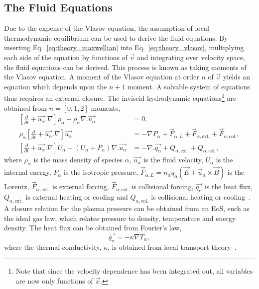 \subsection{The Fluid Equations}%
\label{sec:theory_fluid}

Due to the expense of the Vlasov equation, the assumption of local thermodynamic equilibrium can be used to derive the fluid equations.
By inserting Eq.~\ref{eq:theory_maxwellian} into Eq.~\ref{eq:theory_vlasov}, multiplying each side of the equation by functions of $\vec{v}$ and integrating over velocity space, the fluid equations can be derived.
This process is known as taking moments of the Vlasov equation.
A moment of the Vlasov equation at order $n$ of $\vec{v}$ yields an equation which depends upon the $n+1$ moment.
A solvable system of equations thus requires an external closure.
The inviscid hydrodynamic equations\footnote{Note that since the velocity dependence has been integrated out, all variables are now only functions of $\vec{x}$.} are obtained from $n=[0,1,2]$ moments,
\begin{align}
    \label{eq:theory_fluid_eqs_1}
    \left [ \frac{\partial}{\partial t} + \vec{u_\alpha}.\nabla \right ] \rho_\alpha + \rho_\alpha\nabla . \vec{u_\alpha} &= 0,\\
    \label{eq:theory_fluid_eqs_2}
    \rho_\alpha \left [ \frac{\partial}{\partial t} + \vec{u_\alpha}.\nabla \right ] \vec{u_\alpha} &= -\nabla P_\alpha + \vec{F}_{\alpha,L} + \vec{F}_{\alpha,\text{ext.}} + \vec{F}_{\alpha,\text{col.}},\\
    \label{eq:theory_fluid_eqs_3}
    \left [ \frac{\partial}{\partial t} + \vec{u_\alpha}.\nabla \right ] U_\alpha + (U_\alpha + P_\alpha)\nabla.\vec{u_\alpha} &= -\nabla . \vec{q_\alpha} + Q_{\alpha,\text{ext.}} + Q_{\alpha,\text{col.}},
\end{align}
where $\rho_\alpha$ is the mass density of species $\alpha$, $\vec{u_\alpha}$ is the fluid velocity, $U_\alpha$ is the internal energy, $P_\alpha$ is the isotropic pressure, $\vec{F}_{\alpha,L} = n_\alpha q_\alpha (\vec{E} + \vec{u}_\alpha \times \vec{B})$ is the Lorentz, $\vec{F}_{\alpha,\text{ext.}}$ is external forcing, $\vec{F}_{\alpha,\text{col.}}$ is collisional forcing, $\vec{q_\alpha}$ is the heat flux, $Q_{\alpha,\text{ext.}}$ is external heating or cooling and $Q_{\alpha,\text{col.}}$ is collisional heating or cooling~\cite{castor_radiation_2004}.
A closure relation for the plasma pressure can be obtained from an \ac{EoS}, such as the ideal gas law, which relates pressure to density, temperature and energy density.
The heat flux can be obtained from Fourier's law,
\begin{equation}
    \label{eq:theory_fourier_heat}
    \vec{q_\alpha} = -\kappa \nabla T_\alpha,
\end{equation}
where the thermal conductivity, $\kappa$, is obtained from local transport theory~\cite{braginskii_transport_1965,epperlein_plasma_1986}.

